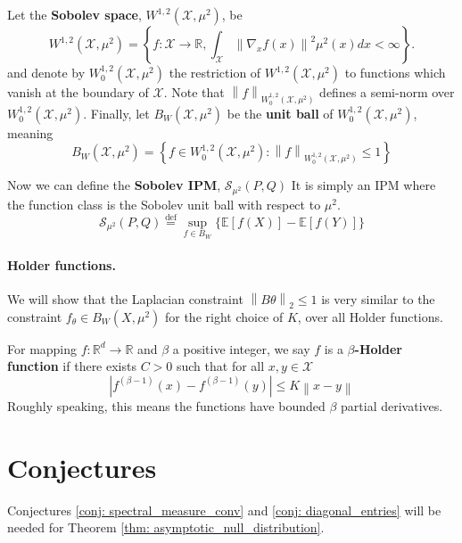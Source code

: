 \documentclass{article}
\newcommand{\Reals}{\mathbb{R}}
\newcommand{\Expect}[1]{\mathbb{E}\left[ #1 \right]}
\newcommand{\norm}[1]{\left\lVert#1\right\rVert}
\newcommand{\abs}[1]{\left \lvert #1 \right \rvert}
\newcommand{\set}[1]{\left\{#1\right\}}
\newcommand{\X}{\mathcal{X}}
\newcommand{\Rd}{\Reals^d}
\theoremstyle{alden}
\theoremstyle{definition}
\theoremstyle{remark}
\begin{document}
Let the \textbf{Sobolev space}, $W^{1,2}(\mathcal{X}, \mu^2)$, be 
\begin{equation*}
W^{1,2}(\mathcal{X},\mu^2) = \set{f: \X \to \Reals, \int_{\X} \norm{\nabla_x f(x)}^2 \mu^2(x) dx < \infty}.
\end{equation*}
and denote by $W_0^{1,2}(\mathcal{X}, \mu^2)$ the restriction of $W^{1,2}(\mathcal{X}, \mu^2)$ to functions which vanish at the boundary of $\X$. Note that $\norm{f}_{W_0^{1,2}(\X, \mu^2)}$ defines a semi-norm over $W_0^{1,2}(\X, \mu^2)$. Finally, let $B_W(\X, \mu^2)$ be the \textbf{unit ball} of $W_0^{1,2}(\X, \mu^2)$, meaning
\begin{equation*}
B_W(\X, \mu^2) = \set{f \in W_0^{1,2}(\X, \mu^2): \norm{f}_{W_0^{1,2}(\X, \mu^2)} \leq 1}
\end{equation*}

Now we can define the \textbf{Sobolev IPM}, $\mathcal{S}_{\mu^2}(P,Q)$ It is simply an IPM where the function class is the Sobolev unit ball with respect to $\mu^2$.
\begin{equation*}
\mathcal{S}_{\mu^2}(P,Q) \overset{\mathrm{def}}{=} \sup_{f \in B_W} \biggl\{ \Expect{f(X)} - \Expect{f(Y)}\biggr\}
\end{equation*}

\paragraph{Holder functions.}
We will show that the Laplacian constraint $\norm{B \theta}_2 \leq 1$ is very similar to the constraint $f_{\theta} \in B_W(X,\mu^2)$ for the right choice of $K$, over all Holder functions. 

For mapping $f: \Rd \to \Reals$ and $\beta$ a positive integer, we say $f$ is a \textbf{$\beta$-Holder function} if there exists $C > 0$ such that for all $x, y \in \X$
\begin{equation*}
\abs{f^{(\beta - 1)}(x) - f^{(\beta - 1)}(y)} \leq K \norm{x - y}
\end{equation*}
Roughly speaking, this means the functions have bounded $\beta$ partial derivatives.

\section{Conjectures}

Conjectures \ref{conj: spectral_measure_conv} and \ref{conj: diagonal_entries} will be needed for Theorem \ref{thm: asymptotic_null_distribution}.
\end{document}
